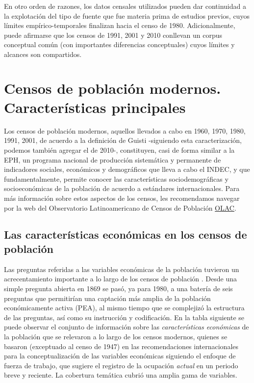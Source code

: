 \documentclass[
]{book}
\begin{document}
En otro orden de razones, los datos censales utilizados pueden dar continuidad a la explotación del tipo de fuente que fue materia prima de estudios previos, cuyos límites empírico-temporales finalizan hacia el censo de 1980. Adicionalmente, puede afirmarse que los censos de 1991, 2001 y 2010 conllevan un corpus conceptual común (con importantes diferencias conceptuales) cuyos límites y alcances son compartidos.

\hypertarget{censos}{%
\section{Censos de población modernos. Características principales}\label{censos}}

Los censos de población modernos, aquellos llevados a cabo en 1960, 1970, 1980, 1991, 2001, de acuerdo a la definición de Guisti \citeyearpar{Giusti2007} -siguiendo esta caracterización, podemos también agregar el de 2010-, constituyen, casi de forma similar a la EPH, un programa nacional de producción sistemática y permanente de indicadores sociales, económicos y demográficos que lleva a cabo el INDEC, y que fundamentalmente, permite conocer las características sociodemográficas y socioeconómicas de la población de acuerdo a estándares internacionales. Para más información sobre estos aspectos de los censos, les recomendamos navegar por la web del Observatorio Latinoamericano de Censos de Población \href{https://observatoriocensal.org/}{OLAC}.

\hypertarget{las-caracteruxedsticas-econuxf3micas-en-los-censos-de-poblaciuxf3n}{%
\subsection{Las características económicas en los censos de población}\label{las-caracteruxedsticas-econuxf3micas-en-los-censos-de-poblaciuxf3n}}

Las preguntas referidas a las variables económicas de la población tuvieron un acrecentamiento importante a lo largo de los censos de población \citep[p.~49]{Minujin1987}. Desde una simple pregunta abierta en 1869 se pasó, ya para 1980, a una batería de seis preguntas que permitirían una captación más amplia de la población económicamente activa (PEA), al mismo tiempo que se complejizó la estructura de las preguntas, así como su instrucción y codificación. En la tabla siguiente se puede observar el conjunto de información sobre las \emph{características económicas} de la población que se relevaron a lo largo de los censos modernos, quienes se basaron (exceptuado al censo de 1947) en las recomendaciones internacionales para la conceptualización de las variables económicas siguiendo el enfoque de fuerza de trabajo, que sugiere el registro de la ocupación \emph{actual} en un periodo breve y reciente. La cobertura temática cubrió una amplia gama de variables.
\end{document}
